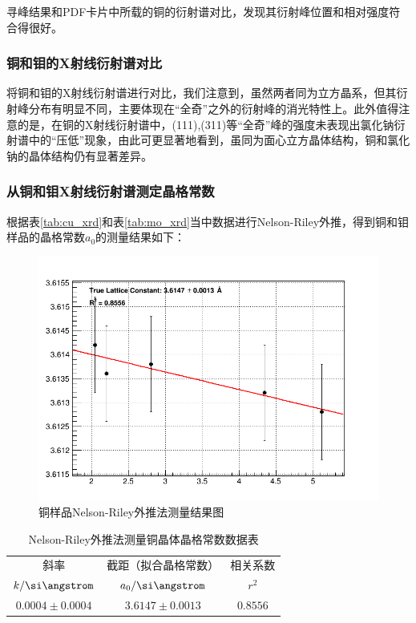 \documentclass{thuemp}
\begin{document}
寻峰结果和PDF卡片中所载的铜的衍射谱对比，发现其衍射峰位置和相对强度符合得很好。

\subsubsection{铜和钼的X射线衍射谱对比}

将铜和钼的X射线衍射谱进行对比，我们注意到，虽然两者同为立方晶系，但其衍射峰分布有明显不同，主要体现在“全奇”之外的衍射峰的消光特性上。此外值得注意的是，在铜的X射线衍射谱中，(111),(311)等“全奇”峰的强度未表现出氯化钠衍射谱中的“压低”现象，由此可更显著地看到，虽同为面心立方晶体结构，铜和氯化钠的晶体结构仍有显著差异。

\subsubsection{从铜和钼X射线衍射谱测定晶格常数}

根据表\ref{tab:cu_xrd}和表\ref{tab:mo_xrd}当中数据进行Nelson-Riley外推，得到铜和钼样品的晶格常数$a_0$的测量结果如下：

\begin{figure}[H]
    \centering
    \includegraphics[width=0.8\linewidth]{../Data/Fit_cu_xrd.png}
    \caption{铜样品Nelson-Riley外推法测量结果图}
    \label{fig:cu_xrd_extrapol}
\end{figure}

\begin{table}[H]
    \centering
    \captionnamefont{\wuhao\bf\heiti}
    \captiontitlefont{\wuhao\bf\heiti}
    \caption{Nelson-Riley外推法测量铜晶体晶格常数数据表}
    \label{tab:cu_xrd_extrapol}
    \liuhao
    \begin{tabular}{ccc}
        \toprule
        斜率 & 截距（拟合晶格常数） & 相关系数 \\
        $k/\text{\si\angstrom}$ & $a_0/\text{\si\angstrom}$ & $r^2$\\
        \midrule
        $0.0004 \pm 0.0004$ & $3.6147 \pm 0.0013$ & $0.8556$ \\
        \bottomrule
    \end{tabular}
\end{table}
\end{document}
